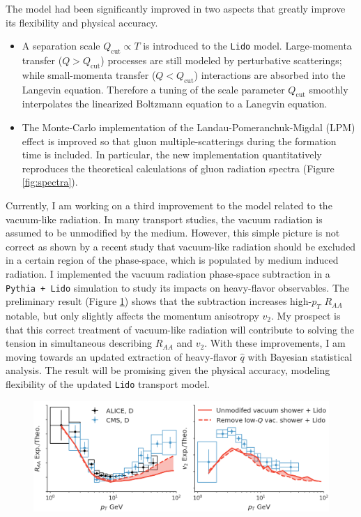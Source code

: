 \documentclass[12pt,a4paper]{article}
\begin{document}
The model had been significantly improved in two aspects that greatly improve its flexibility and physical accuracy.
\begin{itemize}
\item[1.] A separation scale $Q_{\textrm{cut}}\propto T$ is introduced to the {\tt Lido} model. 
Large-momenta transfer ($Q > Q_{\textrm{cut}}$) processes are still modeled by perturbative scatterings; while small-momenta transfer ($Q < Q_{\textrm{cut}}$) interactions are absorbed into the Langevin equation. 
Therefore a tuning of the scale parameter $Q_{\textrm{cut}}$ smoothly interpolates the linearized Boltzmann equation to a Lanegvin equation.
\item[2.] The Monte-Carlo implementation of the Landau-Pomeranchuk-Migdal (LPM) effect is improved so that gluon multiple-scatterings during the formation time is included. 
In particular, the new implementation quantitatively reproduces the theoretical calculations of gluon radiation spectra (Figure \ref{fig:spectra}).
\end{itemize}

Currently, I am working on a third improvement to the model related to the vacuum-like radiation. 
In many transport studies, the vacuum radiation is assumed to be unmodified by the medium.
However, this simple picture is not correct as shown by a recent study \cite{Caucal:2018dla} that vacuum-like radiation should be excluded in a certain region of the phase-space, which is populated by medium induced radiation.
I implemented the vacuum radiation phase-space subtraction in a {\tt Pythia + Lido} simulation to study its impacts on heavy-flavor observables.
The preliminary result (Figure \ref{fig:prelim}) shows that the subtraction increases high-$p_T$ $R_{AA}$ notable, but only slightly affects the momentum anisotropy $v_2$.
My prospect is that this correct treatment of vacuum-like radiation will contribute to solving the tension in simultaneous describing $R_{AA}$ and $v_2$.
With these improvements, I am moving towards an updated extraction of heavy-flavor $\hat{q}$ with Bayesian statistical analysis.
The result will be promising given the physical accuracy, modeling flexibility of the updated {\tt Lido} transport model.

\begin{figure}[ht]
\begin{center}
\includegraphics[width=.85\textwidth]{Lido_obs.png}
\caption{}\label{fig:prelim}
\end{center}
\end{figure}
\end{document}

